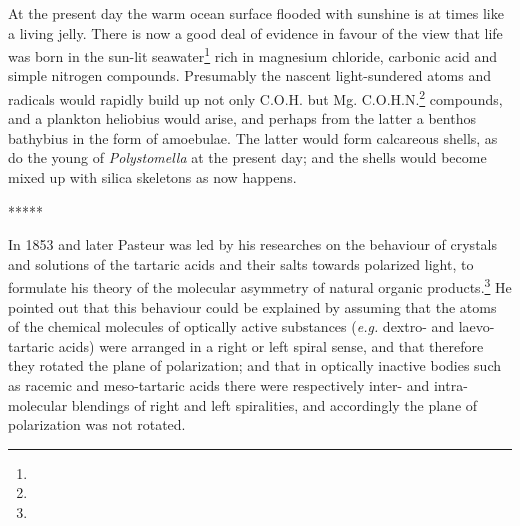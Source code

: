 \documentclass[a4paper, 12pt, oneside]{article}
\begin{document}
At the present day the warm ocean surface flooded with sunshine is at times like a living jelly. There is now a good deal of evidence in favour of the view that life was born in the sun-lit seawater\footnote{} rich in magnesium chloride, carbonic acid and simple nitrogen compounds. Presumably the nascent light-sundered atoms and radicals would rapidly build up not only C.O.H. but Mg. C.O.H.N.\footnote{} compounds, and a plankton heliobius would arise, and perhaps from the latter a benthos bathybius in the form of amoebulae. The latter would form calcareous shells, as do the young of \emph{Polystomella} at the present day; and the shells would become mixed up with silica skeletons as now happens.

\centerline{*\hspace{15mm}*\hspace{15mm}*\hspace{15mm}*\hspace{15mm}*}
\bigskip

In 1853 and later Pasteur was led by his researches on the behaviour of crystals and solutions of the tartaric acids and their salts towards polarized light, to formulate his theory of the molecular asymmetry of natural organic products.\footnote{} He pointed out that this behaviour could be explained by assuming that the atoms of the chemical molecules of optically active substances (\emph{e.g.} dextro- and laevo-tartaric acids) were arranged in a right or left spiral sense, and that therefore they rotated the plane of polarization; and that in optically inactive bodies such as racemic and meso-tartaric acids there were respectively inter- and intra-molecular blendings of right and left spiralities, and accordingly the plane of polarization was not rotated.
\end{document}
